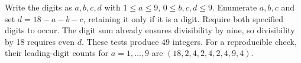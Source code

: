 Write the digits as $a,b,c,d$ with $1\le a\le9$, $0\le b,c,d\le9$. Enumerate $a,b,c$ and set $d=18-a-b-c$, retaining it only if it is a digit. Require both specified digits to occur. The digit sum already ensures divisibility by nine, so divisibility by 18 requires even $d$. These tests produce $\boxed{49}$ integers. For a reproducible check, their leading-digit counts for $a=1,\ldots,9$ are $(18,2,4,2,4,2,4,9,4)$.
